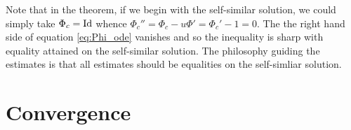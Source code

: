 \documentclass[12pt]{amsart}
\begin{document}
\begin{remark}
 Note that in the theorem, if we begin with the self-similar solution, we could simply take $\Phi_c = \operatorname{Id}$ whence $\Phi_c'' = \Phi_c - u \Phi' = \Phi_c' - 1 = 0$. The the right hand side of equation \eqref{eq:Phi_ode} vanishes and so the inequality is sharp with equality attained on the self-similar solution. The philosophy guiding the estimates is that all estimates should be equalities on the self-simliar solution.
\end{remark}

\section{Convergence}
\label{sec:orgheadline12}

\section*{}

\printbibliography
\end{document}
